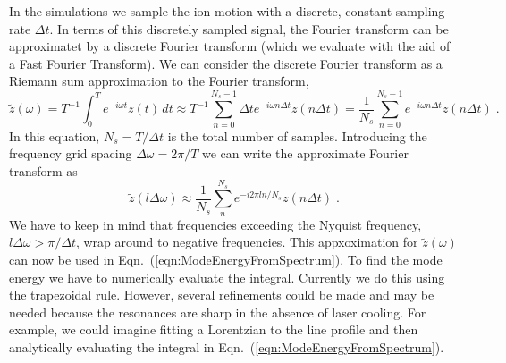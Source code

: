 \documentclass[aps, pra, preprint]{revtex4-1}
\begin{document}
In the simulations we sample the ion motion with a discrete,
constant sampling rate $\Delta t$. In terms of this discretely
sampled signal, the Fourier transform can be approximatet by a
discrete Fourier transform (which we evaluate with the aid of a
Fast Fourier Transform). We can consider the discrete Fourier
transform as a Riemann sum approximation to the Fourier
transform,
\begin{equation}
  \tilde{z}(\omega)=
  T^{-1}\int_0^Te^{-i\omega t}z(t)\,dt \approx
  T^{-1}\sum_{n=0}^{N_s - 1}\Delta t e^{-i\omega n\Delta t}z(n \Delta t) =
  \frac{1}{N_s}\sum_{n=0}^{N_s-1}e^{-i\omega n\Delta t}z(n \Delta t)\;.
\end{equation}
In this equation, $N_s = T / \Delta t$ is the total number of
samples. Introducing the frequency grid spacing
$\Delta\omega=2\pi/T$ we can write the approximate Fourier
transform as
\begin{equation}
  \tilde{z}(l\Delta\omega)\approx
  \frac{1}{N_s}\sum_n^{N_s}e^{-i2\pi ln/N_s}z(n \Delta t)\;.
\end{equation}
We have to keep in mind that frequencies exceeding the Nyquist
frequency, $l\Delta\omega>\pi/\Delta t$, wrap around to negative
frequencies. This appxoximation for $\tilde{z}(\omega)$ can now
be used in Eqn.~(\ref{eqn:ModeEnergyFromSpectrum}). To find the
mode energy we have to numerically evaluate the integral.
Currently we do this using the trapezoidal rule. However, several
refinements could be made and may be needed because the
resonances are sharp in the absence of laser cooling. For
example, we could imagine fitting a Lorentzian to the line
profile and then analytically evaluating the integral in
Eqn.~(\ref{eqn:ModeEnergyFromSpectrum}).
\end{document}
